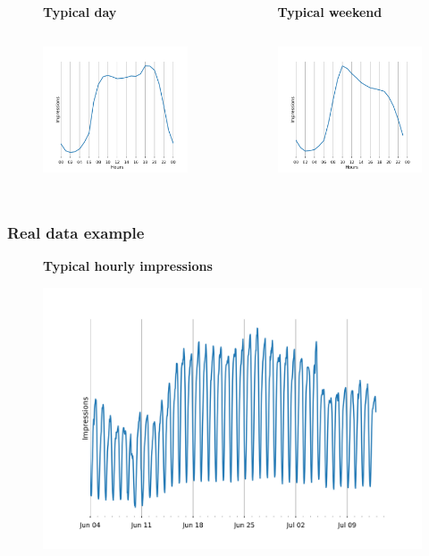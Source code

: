 \documentclass[intlimits, 9pt, unicode]{beamer}
\begin{document}
\begin{frame}
   \begin{columns}
    \begin{column}{0.5\textwidth}
	\begin{figure}
	\textbf{Typical day}\par\medskip
	\includegraphics[height=4.5cm]{images/examples_day}
	\end{figure}
     \end{column}
    \begin{column}{0.5\textwidth}
	\begin{figure}
	\textbf{Typical weekend}\par\medskip
	\includegraphics[height=4.5cm]{images/examples_weekend}
	\end{figure}
     \end{column}
     \end{columns}

\end{frame}

\begin{frame}
\frametitle{Real data example}
\begin{figure}
\textbf{Typical hourly impressions}\par\medskip
\includegraphics[scale=0.30]{images/examples_month}
\end{figure}
\end{frame}
\end{document}
